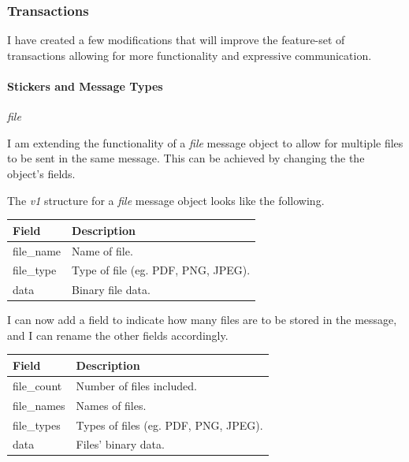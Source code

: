\documentclass{article}
\begin{document}
\subsubsection{Transactions}
I have created a few modifications that will improve the feature-set of transactions allowing for more functionality and expressive communication.

\paragraph{Stickers and Message Types}
\begin{center}
    \Large{\textit{file}}
\end{center}
I am extending the functionality of a \textit{file} message object to allow for multiple files to be sent in the same message. This can be achieved by changing the the object's fields.

The \textit{v1} structure for a \textit{file} message object looks like the following.
\begin{table}[H]
\centering
\begin{tabular}{|p{2.5cm}|p{8.5cm}|}
\hline
\rowcolor{tblgrey} 
Field           & Description                                               \\ \hline
file\_name      & Name of file.                                             \\ \hline
file\_type      & Type of file (eg. PDF, PNG, JPEG).                        \\ \hline
data            & Binary file data.                                         \\ \hline
\end{tabular}
\end{table}

I can now add a field to indicate how many files are to be stored in the message, and I can rename the other fields accordingly.
\begin{table}[H]
\centering
\begin{tabular}{|p{2.5cm}|p{8.5cm}|}
\hline
\rowcolor{tblgrey} 
Field           & Description                                               \\ \hline
file\_count     & Number of files included.                                 \\ \hline
file\_names     & Names of files.                                           \\ \hline
file\_types     & Types of files (eg. PDF, PNG, JPEG).                      \\ \hline
data            & Files' binary data.                                       \\ \hline
\end{tabular}
\end{table}
\end{document}
